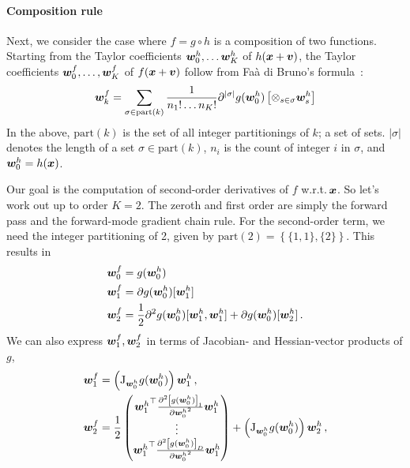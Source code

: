 \paragraph{Composition rule}
Next, we consider the case where $f = g \circ h$ is a composition of two functions. Starting from the Taylor coefficients ${\bm{w}}_0^h, \dots {\bm{w}}_K^h$ of $h({\bm{x}} + {\bm{v}})$, the Taylor coefficients ${\bm{w}}_0^f, \dots, {\bm{w}}_K^f$ of $f({\bm{x}} + {\bm{v}})$ follow from Fa\`a di Bruno's formula~\cite{griewank2008evaluating,bettencourt2019taylor}:
\begin{align}\label{eq:taylor-mode-forward}
  {\bm{w}}_{k}^f
  =
  \sum_{\sigma \in \mathrm{part}(k)}
  \frac{1}{n_1! \dots n_K!}
  \partial^{|\sigma|}g({\bm{w}}_0^h)
  \left[
  \otimes_{s \in \sigma}
  {\bm{w}}_s^h
  \right]
\end{align}
In the above, $\mathrm{part}(k)$ is the set of all integer partitionings of $k$; a set of sets. $|\sigma|$ denotes the length of a set $\sigma \in \mathrm{part}(k)$, $n_i$ is the count of integer $i$ in $\sigma$, and ${\bm{w}}_0^h = h({\bm{x}})$.

Our goal is the computation of second-order derivatives of $f$ w.r.t.\,${\bm{x}}$.
So let's work out  up to order $K=2$.
The zeroth and first order are simply the forward pass and the forward-mode gradient chain rule.
For the second-order term, we need the integer partitioning of 2, given by $\mathrm{part}(2) = \left\{ \{1, 1\}, \{2\} \right\}$.
This results in
\begin{subequations}\label{eq:taylor-mode-second-order}
  \begin{align}
    {\bm{w}}_0^f
    &=
      g({\bm{w}}_0^h)
    \\
    {\bm{w}}_1^f
    &=
      \partial g({\bm{w}}_0^h)[{\bm{w}}_1^h]
    \\
    {\bm{w}}_2^f
    &=
      \frac{1}{2}
      \partial^2 g({\bm{w}}_0^h)[{\bm{w}}_1^h, {\bm{w}}_1^h]
      +
      \partial g({\bm{w}}_0^h)[{\bm{w}}_2^h]\,.
  \end{align}
\end{subequations}
We can also express ${\bm{w}}_1^f, {\bm{w}}_2^f$ in terms of Jacobian- and Hessian-vector products of $g$,
\begin{subequations}\label{eq:taylor-mode-second-order-jac-hess}
  \begin{align}
    {\bm{w}}_1^f
    &=
      \left(
      \mathrm{J}_{{\bm{w}}_0^h} g({\bm{w}}_0^h)
      \right) {\bm{w}}_1^h\,,
    \\
    {\bm{w}}_2^f
    &=
      \frac{1}{2}
      \begin{pmatrix}
        {{\bm{w}}_1^h}^{\top}
        \frac{
        \partial^2 \left[ g({\bm{w}}_0^h) \right]_1
        }{
        \partial{{\bm{w}}_0^h}^2
        }
        {\bm{w}}_1^h
        \\
        \vdots
        \\
        {{\bm{w}}_1^h}^{\top}
        \frac{
        \partial^2 \left[ g({\bm{w}}_0^h) \right]_D
        }{
        \partial{{\bm{w}}_0^h}^2
        }
        {\bm{w}}_1^h
      \end{pmatrix}
      +
      \left(
      \mathrm{J}_{{\bm{w}}_0^h} g({\bm{w}}_0^h)
      \right) {\bm{w}}_2^h\,,
  \end{align}
\end{subequations}

